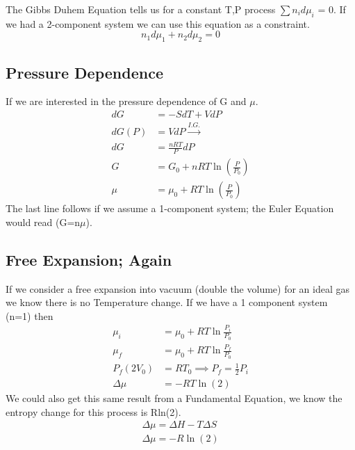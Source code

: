\documentclass{article}
\begin{document}
The Gibbs Duhem Equation tells us for a constant T,P process $\sum n_id\mu_i$ = 0.
If we had a 2-component system we can use this equation as a constraint. 
\begin{equation}
    n_1d\mu_1 + n_2 d\mu_2 = 0
\end{equation}

\subsection*{Pressure Dependence}
If we are interested in the pressure dependence of G and $\mu$. 
\begin{equation}
    \begin{split}
        dG &= -SdT + VdP \\
        dG(P) &= VdP \xrightarrow{I.G.} \\
        dG &= \frac{nRT}{P}dP \\
        G &= G_0 + nRT\ln\left(\frac{P}{P_0}\right) \\
        \mu &= \mu_0 + RT\ln\left(\frac{P}{P_0}\right)
    \end{split}
\end{equation}
The last line follows if we assume a 1-component system; the Euler Equation would read (G=n$\mu$). 

\subsection*{Free Expansion; Again}
If we consider a free expansion into vacuum (double the volume) for an ideal gas we know there is no Temperature change. 
If we have a 1 component system (n=1) then 
\begin{equation}
\begin{split}
    \mu_i &= \mu_0 +RT \ln\frac{P_i}{P_0} \\
    \mu_f &= \mu_0 +RT \ln\frac{P_f}{P_0} \\
    P_f (2V_0) &= RT_0 \implies P_f = \frac{1}{2}P_i\\
    \Delta\mu &= -RT\ln(2)
    \end{split}
\end{equation}
We could also get this same result from a Fundamental Equation, we know the entropy change for this process is Rln(2). 
\begin{equation}
    \begin{split}
        \Delta \mu = \Delta H - T\Delta S \\
        \Delta \mu = -R\ln(2)
    \end{split}
\end{equation}
\end{document}
